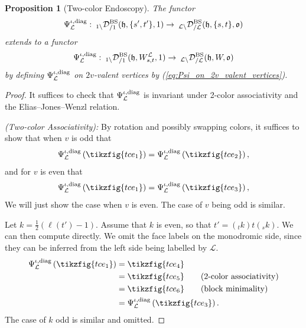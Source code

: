 \documentclass{amsart}
\newcommand{\scrL}{\mathcal{L}}
\newcommand{\fr}[1]{\mathfrak{#1}}
\DeclareMathOperator{\BS}{BS}
\newcommand{\EWmon}[2]{\:_{#1 \backslash} \mathcal{D}_{/ #2} }
\newtheorem{proposition}[subsubsection]{Proposition}
\theoremstyle{definition}
\numberwithin{equation}{subsection}
\begin{document}
\begin{proposition}[Two-color Endoscopy]\label{prop:two_color_endoscopy}
    The functor 
    \[\Psi_{\scrL}^{\iota, \textnormal{diag}} : \EWmon{1}{1}^{\BS} (\fr{h}, \{s',t'\}, 1) \to \EWmon{\scrL}{\scrL}^{\BS} (\fr{h}, \{s,t\}, \fr{o})\] 
    extends to a functor
    \[\Psi_{\scrL}^{\iota, \textnormal{diag}} : \EWmon{1}{1}^{\BS} (\fr{h}, W_{s,t}^{\scrL},  1) \to \EWmon{\scrL}{\scrL}^{\BS} (\fr{h}, W, \fr{o})\]
    by defining $\Psi_{\scrL}^{\iota, \textnormal{diag}}$ on $2v$-valent vertices by (\ref{eq:Psi_on_2v_valent_vertices}).
\end{proposition}
\begin{proof}
    It suffices to check that $\Psi_{\scrL}^{\iota, \textnormal{diag}}$ is invariant under 2-color associativity and the Elias--Jones--Wenzl relation.

    \emph{(Two-color Associativity): } By rotation and possibly swapping colors, it suffices to show that when $v$ is odd that
    \[\Psi_{\scrL}^{\iota, \textnormal{diag}} \left( \tikzfig{tce_1}\right) = \Psi_{\scrL}^{\iota, \textnormal{diag}} \left( \tikzfig{tce_2}\right),\]
    and for $v$ is even that
     \[ \Psi_{\scrL}^{\iota, \textnormal{diag}} \left( \tikzfig{tce_1}\right) = \Psi_{\scrL}^{\iota, \textnormal{diag}} \left( \tikzfig{tce_3}\right),\]
    We will just show the case when $v$ is even. The case of $v$ being odd is similar.

    Let $k = \frac{1}{2} (\ell (t') -1)$. Assume that $k$ is even, so that $t' = ({}_t k) t ({}_s k)$.
    We can then compute directly. We omit the face labels on the monodromic side, since they can be inferred from the left side being labelled by $\scrL$.
    \begin{align*}
        \Psi_{\scrL}^{\iota, \textnormal{diag}} \left( \tikzfig{tce_1}\right) &= \tikzfig{tce_4} \\
        &= \tikzfig{tce_5} \tag{2-color associativity}\\
        &= \tikzfig{tce_6} \tag{block minimality}\\
        &= \Psi_{\scrL}^{\iota, \textnormal{diag}} \left( \tikzfig{tce_3}\right).
    \end{align*}
    The case of $k$ odd is similar and omitted.


\end{proof}
\end{document}
